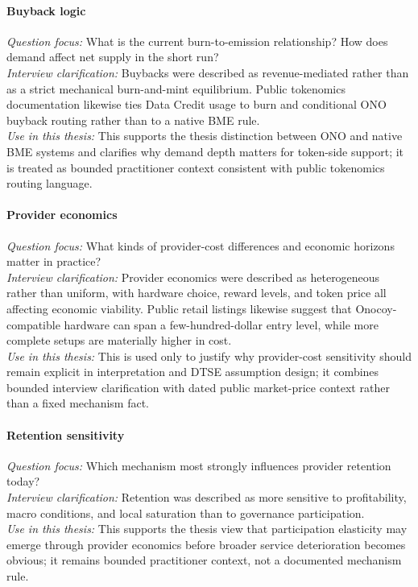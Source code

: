 \paragraph{Buyback logic}
\emph{Question focus:} What is the current burn-to-emission relationship? How does demand affect net supply in the short run? \\
\emph{Interview clarification:} Buybacks were described as revenue-mediated rather than as a strict mechanical burn-and-mint equilibrium. Public tokenomics documentation likewise ties Data Credit usage to burn and conditional ONO buyback routing rather than to a native BME rule. \\
\emph{Use in this thesis:} This supports the thesis distinction between ONO and native BME systems and clarifies why demand depth matters for token-side support; it is treated as bounded practitioner context consistent with public tokenomics routing language.

\paragraph{Provider economics}
\emph{Question focus:} What kinds of provider-cost differences and economic horizons matter in practice? \\
\emph{Interview clarification:} Provider economics were described as heterogeneous rather than uniform, with hardware choice, reward levels, and token price all affecting economic viability. Public retail listings likewise suggest that Onocoy-compatible hardware can span a few-hundred-dollar entry level, while more complete setups are materially higher in cost. \\
\emph{Use in this thesis:} This is used only to justify why provider-cost sensitivity should remain explicit in interpretation and DTSE assumption design; it combines bounded interview clarification with dated public market-price context rather than a fixed mechanism fact.

\paragraph{Retention sensitivity}
\emph{Question focus:} Which mechanism most strongly influences provider retention today? \\
\emph{Interview clarification:} Retention was described as more sensitive to profitability, macro conditions, and local saturation than to governance participation. \\
\emph{Use in this thesis:} This supports the thesis view that participation elasticity may emerge through provider economics before broader service deterioration becomes obvious; it remains bounded practitioner context, not a documented mechanism rule.

